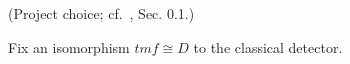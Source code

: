\begin{definition}
\label{frontier:Literature:e51ecaf2ffbc}
(Project choice; cf.\ \cite{BR21}, Sec. 0.1.)\par{}

Fix an isomorphism $\mathit{tmf}\cong D$ to the classical detector.
\end{definition}

